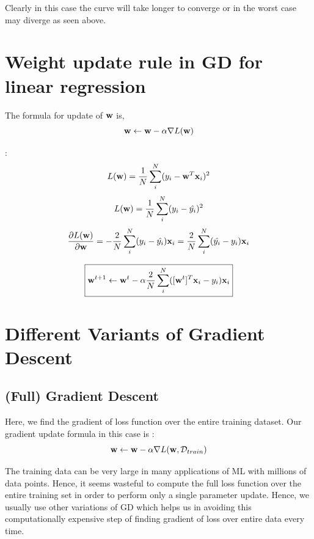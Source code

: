 Clearly in this case the curve will take longer to converge or in the worst case may diverge as seen above.

\section{Weight update rule in GD for linear regression}

The formula for update of $\textbf{w}$ is,
\begin{equation}
  \label{eqn:1}
  \textbf{w} \leftarrow \textbf{w} -\alpha \nabla L(\textbf{w})
\end{equation}

:
\begin{equation}
  L(\textbf{w}) = \frac{1}{N}\sum_{i}^N(y_{i} - \textbf{w}^{T}\textbf{x}_{i})^2
\end{equation}
\begin{equation}
  L(\textbf{w}) = \frac{1}{N}\sum_{i}^N(y_{i} - \hat{y_i})^2
\end{equation}
\begin{equation}
  \label{eqn:3}
  \frac{\partial L(\textbf{w})}{\partial \textbf{w}} = -\frac{2}{N} \sum_{i}^N(y_{i} - \hat{y_{i}})\textbf{x}_i = \frac{2}{N} \sum_{i}^N(\hat{y_{i}} - y_{i})\textbf{x}_i
\end{equation}

$$\boxed{\textbf{w}^{t+1} \leftarrow \textbf{w}^{t} - \alpha \frac{2}{N}\sum_{i}^N([\textbf{w}^t]^T\textbf{x}_i - y_{i})\textbf{x}_i}$$

\section{Different Variants of Gradient Descent}
\subsection{(Full) Gradient Descent}

Here, we find the gradient of loss function over the entire training dataset. Our gradient update formula in this case is :
$$
  \textbf{w} \leftarrow \textbf{w} -\alpha \nabla L(\textbf{w}, \mathcal{D}_{train})
$$

The training data can be very large in many applications of ML with millions of data points. Hence, it seems wasteful to compute the full loss function over the entire training set in order to perform only a single parameter update. Hence, we usually use other variations of GD which helps us in avoiding this computationally expensive step of finding gradient of loss over entire data every time.

